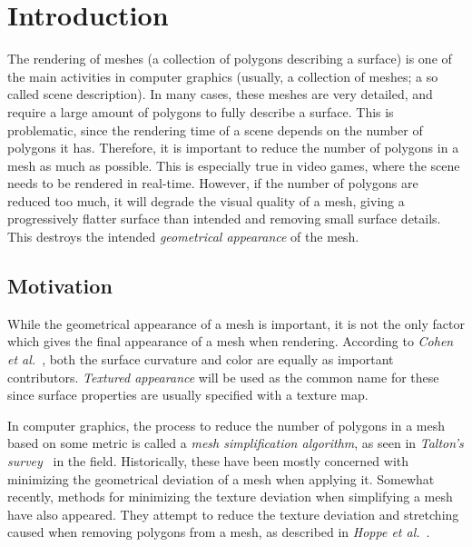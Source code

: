 

\chapter{Introduction} \label{cha:introduction}
The rendering of meshes (a collection of polygons describing a surface) is one of the main activities in computer graphics (usually, a collection of meshes; a so called scene description). In many cases, these meshes are very detailed, and require a large amount of polygons to fully describe a surface. This is problematic, since the rendering time of a scene depends on the number of polygons it has. Therefore, it is important to reduce the number of polygons in a mesh as much as possible. This is especially true in video games, where the scene needs to be rendered in real-time. However, if the number of polygons are reduced too much, it will degrade the visual quality of a mesh, giving a progressively flatter surface than intended and removing small surface details. This destroys the intended \emph{geometrical appearance} of the mesh.


\section{Motivation} \label{sec:motivation}
While the geometrical appearance of a mesh is important, it is not the only factor which gives the final appearance of a mesh when rendering. According to \emph{Cohen et al.}~\cite{cohen1998appearance}, both the surface curvature and color are equally as important contributors. \emph{Textured appearance} will be used as the common name for these since surface properties are usually specified with a texture map.

In computer graphics, the process to reduce the number of polygons in a mesh based on some metric is called a \emph{mesh simplification algorithm}, as seen in \emph{Talton's survey}~\cite{talton2004short} in the field. Historically, these have been mostly concerned with minimizing the geometrical deviation of a mesh when applying it. Somewhat recently, methods for minimizing the texture deviation when simplifying a mesh have also appeared. They attempt to reduce the texture deviation and stretching caused when removing polygons from a mesh, as described in \emph{Hoppe et al.}~\cite{hoppe1996progressive}.

